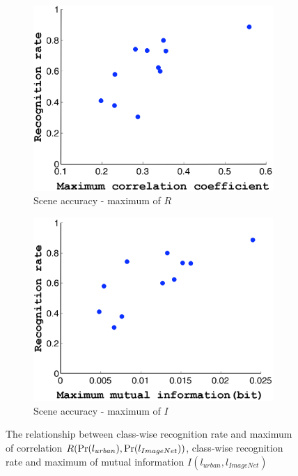 \documentclass[10pt,twocolumn,letterpaper]{article}
\begin{document}
\begin{figure}[!t]
\begin{center}
\begin{subfigure}[b]{0.23\textwidth}
        \end{subfigure}
                \begin{subfigure}[b]{0.23\textwidth}
                \includegraphics[width=\textwidth]{accuracy_corr1.png}
                \caption{Scene accuracy - maximum of $R$}
                \label{sb3}
        \end{subfigure}
                \begin{subfigure}[b]{0.23\textwidth}
                \includegraphics[width=\textwidth]{accuracy_mutinf1.png}
                \caption{Scene accuracy - maximum of $I$}
                \label{sb4}
        \end{subfigure}
\end{center}
\caption{The relationship between class-wise recognition rate and maximum of correlation $R(\textup{Pr}(l_{urban}),\textup{Pr}(l_{ImageNet}))$, class-wise recognition rate and maximum of mutual information $I(l_{urban},l_{ImageNet})$}
\label{accuracy_correlation_mutu}
\end{figure}
\end{document}
